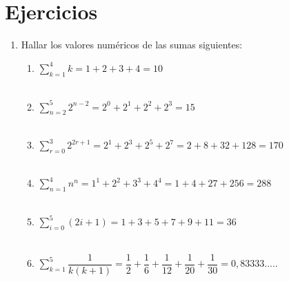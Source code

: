 \section{Ejercicios}
\begin{enumerate}[\bfseries  1.]
\item Hallar los valores numéricos de las sumas siguientes:
\begin{enumerate}[\bfseries a)]
\item $\displaystyle\sum_{k=1}^{4} k = 1 + 2 + 3 + 4 = 10$\\\\
\item $\displaystyle\sum_{n=2}^{5} 2^{n-2} = 2^{0} + 2^{1} + 2^{2} + 2^{3} = 15$\\\\
\item $\displaystyle\sum_{r=0}^{3} 2^{2r+1} = 2^{1} + 2^{3} +  2^{5} + 2^{7} = 2 + 8 + 32 + 128 = 170$ \\\\
\item $\displaystyle\sum_{n=1}^{4} n^n = 1^1 + 2^2 + 3^3 + 4^4 = 1 + 4 + 27 + 256= 288$ \\\\
\item $\displaystyle\sum_{i=0}^{5} (2i + 1) = 1 + 3 + 5 + 7 + 9 + 11 = 36$ \\\\
\item $\displaystyle\sum_{k=1}^{5} \dfrac{1}{k(k+1)} = \dfrac{1}{2} + \dfrac{1}{6} + \dfrac{1}{12} + \dfrac{1}{20} + \dfrac{1}{30} = 0,83333.....$ \\\\
\end{enumerate}


\end{enumerate}
